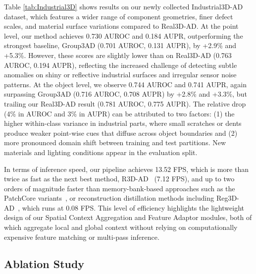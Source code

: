 Table \ref{tab:Industrial3D} shows results on our newly collected Industrial3D-AD dataset, which features a wider range of component geometries, finer defect scales, and material surface variations compared to Real3D-AD. At the point level, our method achieves 0.730 AUROC and 0.184 AUPR, outperforming the strongest baseline, Group3AD \cite{zhu2024towards} (0.701 AUROC, 0.131 AUPR), by +2.9\% and +5.3\%. However, these scores are slightly lower than on Real3D-AD (0.763 AUROC, 0.194 AUPR), reflecting the increased challenge of detecting subtle anomalies on shiny or reflective industrial surfaces and irregular sensor noise patterns. At the object level, we observe 0.744 AUROC and 0.741 AUPR, again surpassing Group3AD (0.716 AUROC, 0.708 AUPR) by +2.8\% and +3.3\%, but trailing our Real3D-AD result (0.781 AUROC, 0.775 AUPR). The relative drop (4\% in AUROC and 3\% in AUPR) can be attributed to two factors: (1) the higher within-class variance in industrial parts, where small scratches or dents produce weaker point-wise cues that diffuse across object boundaries and (2) more pronounced domain shift between training and test partitions. New materials and lighting conditions appear in the evaluation split.

In terms of inference speed, our pipeline achieves 13.52 FPS, which is more than twice as fast as the next best method, R3D-AD~\cite{zhou2024r3d} (7.12 FPS), and up to two orders of magnitude faster than memory-bank-based approaches such as the PatchCore variants~\cite{roth2022towards}, or reconstruction distillation methods including Reg3D-AD~\cite{liu2023real3d}, which runs at 0.08 FPS. This level of efficiency highlights the lightweight design of our Spatial Context Aggregation and Feature Adaptor modules, both of which aggregate local and global context without relying on computationally expensive feature matching or multi-pass inference.


\subsection{Ablation Study}

